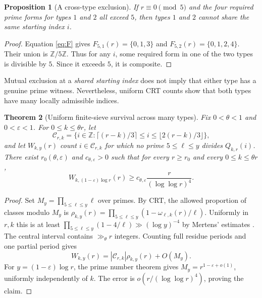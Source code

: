 \documentclass[11pt,a4paper]{article}
\newtheorem{theorem}{Theorem}[section]
\newtheorem{proposition}[theorem]{Proposition}
\theoremstyle{definition}
\theoremstyle{remark}
\newcommand{\Z}{\mathbb Z}
\newcommand{\Ct}{\mathcal C}
\begin{document}
\begin{proposition}[A cross-type exclusion]\label{prop:mod5}
If $r\equiv0\pmod5$ and the four required prime forms for types $1$ and $2$ all exceed $5$, then types $1$ and $2$ cannot share the same starting index $i$.
\end{proposition}
\begin{proof}
Equation \eqref{eq:F} gives
$F_{5,1}(r)=\{0,1,3\}$ and $F_{5,2}(r)=\{0,1,2,4\}$.
Their union is $\Z/5\Z$. Thus for any $i$, some required form in one of the two types is divisible by $5$. Since it exceeds $5$, it is composite.
\end{proof}

Mutual exclusion at a \emph{shared starting index} does not imply that either type has a genuine prime witness.  Nevertheless, uniform CRT counts show that both types have many locally admissible indices.

\begin{theorem}[Uniform finite-sieve survival across many types]\label{thm:uniform}
Fix $0<\theta<1$ and $0<\varepsilon<1$. For $0\le k\le\theta r$, let
\begin{equation}
 \Ct_{r,k}=\{i\in\Z:\lceil(r-k)/3\rceil\le i\le\lfloor2(r-k)/3\rfloor\},
\end{equation}
and let $W_{k,y}(r)$ count $i\in\Ct_{r,k}$ for which no prime $5\le\ell\le y$ divides $Q_{k,r}(i)$.  There exist $r_0(\theta,\varepsilon)$ and $c_{\theta,\varepsilon}>0$ such that for every $r\ge r_0$ and every $0\le k\le\theta r$,
\begin{equation}\label{eq:sieve-bound}
 \boxed{\displaystyle
 W_{k,(1-\varepsilon)\log r}(r)
 \ge c_{\theta,\varepsilon}\frac{r}{(\log\log r)^4}.}
\end{equation}
\end{theorem}
\begin{proof}
Set $M_y=\prod_{5\le\ell\le y}\ell$ over primes.  By CRT, the allowed proportion of classes modulo $M_y$ is
$\rho_{k,y}(r)=\prod_{5\le\ell\le y}(1-\omega_{\ell,k}(r)/\ell)$.
Uniformly in $r,k$ this is at least $\prod_{5\le\ell\le y}(1-4/\ell)\gg(\log y)^{-4}$ by Mertens' estimates \citep{MontgomeryVaughan2007}.  The central interval contains $\gg_\theta r$ integers. Counting full residue periods and one partial period gives
\begin{equation}
 W_{k,y}(r)=|\Ct_{r,k}|\rho_{k,y}(r)+O(M_y).
\end{equation}
For $y=(1-\varepsilon)\log r$, the prime number theorem gives $M_y=r^{1-\varepsilon+o(1)}$, uniformly independently of $k$.  The error is $o(r/(\log\log r)^4)$, proving the claim.
\end{proof}
\end{document}

